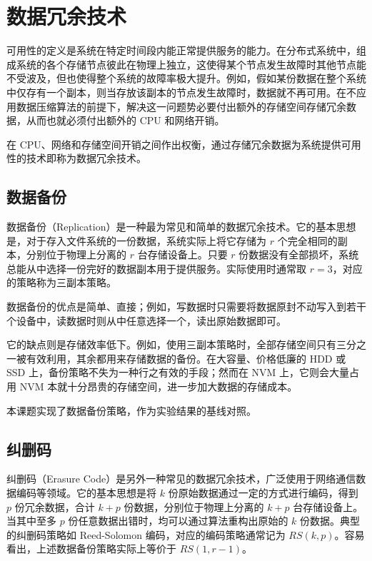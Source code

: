 \section{数据冗余技术}
\label{ch2_avail}

可用性的定义是系统在特定时间段内能正常提供服务的能力。在分布式系统中，组成系统的各个存储节点彼此在物理上独立，这使得某个节点发生故障时其他节点能不受波及，但也使得整个系统的故障率极大提升。例如，假如某份数据在整个系统中仅存有一个副本，则当存放该副本的节点发生故障时，数据就不再可用。在不应用数据压缩算法的前提下，解决这一问题势必要付出额外的存储空间存储冗余数据，从而也就必须付出额外的 CPU 和网络开销。

在 CPU、网络和存储空间开销之间作出权衡，通过存储冗余数据为系统提供可用性的技术即称为数据冗余技术。

\subsection{数据备份}
\label{ch2_avail_repli}

数据备份（Replication）是一种最为常见和简单的数据冗余技术。它的基本思想是，对于存入文件系统的一份数据，系统实际上将它存储为 $r$ 个完全相同的副本，分别位于物理上分离的 $r$ 台存储设备上。只要 $r$ 份数据没有全部损坏，系统总能从中选择一份完好的数据副本用于提供服务。实际使用时通常取 $r = 3$，对应的策略称为三副本策略。

数据备份的优点是简单、直接；例如，写数据时只需要将数据原封不动写入到若干个设备中，读数据时则从中任意选择一个，读出原始数据即可。

它的缺点则是存储效率低下。例如，使用三副本策略时，全部存储空间只有三分之一被有效利用，其余都用来存储数据的备份。在大容量、价格低廉的 HDD 或 SSD 上，备份策略不失为一种行之有效的手段；然而在 NVM 上，它则会大量占用 NVM 本就十分昂贵的存储空间，进一步加大数据的存储成本。

本课题实现了数据备份策略，作为实验结果的基线对照。

\subsection{纠删码}
\label{ch2_avail_ec}

纠删码（Erasure Code）是另外一种常见的数据冗余技术，广泛使用于网络通信数据编码等领域。它的基本思想是将 $k$ 份原始数据通过一定的方式进行编码，得到 $p$ 份冗余数据，合计 $k + p$ 份数据，分别位于物理上分离的 $k + p$ 台存储设备上。当其中至多 $p$ 份任意数据出错时，均可以通过算法重构出原始的 $k$ 份数据。典型的纠删码策略如 Reed-Solomon 编码，对应的编码策略通常记为 $RS(k, p)$。容易看出，上述数据备份策略实际上等价于 $RS(1, r - 1)$。

